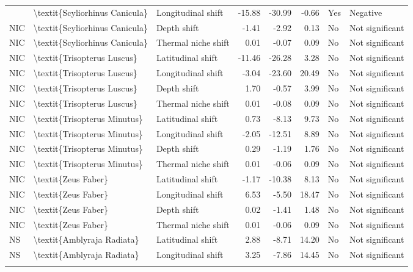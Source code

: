 \begin{longtable}[t]{lllrrrll}
{{NIC & \textbackslash{}textit\{Scyliorhinus Canicula\} & Longitudinal shift & -15.88 & -30.99 & -0.66 & Yes & Negative\\
NIC & \textbackslash{}textit\{Scyliorhinus Canicula\} & Depth shift & -1.41 & -2.92 & 0.13 & No & Not significant\\
\addlinespace
NIC & \textbackslash{}textit\{Scyliorhinus Canicula\} & Thermal niche shift & 0.01 & -0.07 & 0.09 & No & Not significant\\
NIC & \textbackslash{}textit\{Trisopterus Luscus\} & Latitudinal shift & -11.46 & -26.28 & 3.28 & No & Not significant\\
NIC & \textbackslash{}textit\{Trisopterus Luscus\} & Longitudinal shift & -3.04 & -23.60 & 20.49 & No & Not significant\\
NIC & \textbackslash{}textit\{Trisopterus Luscus\} & Depth shift & 1.70 & -0.57 & 3.99 & No & Not significant\\
NIC & \textbackslash{}textit\{Trisopterus Luscus\} & Thermal niche shift & 0.01 & -0.08 & 0.09 & No & Not significant\\
\addlinespace
NIC & \textbackslash{}textit\{Trisopterus Minutus\} & Latitudinal shift & 0.73 & -8.13 & 9.73 & No & Not significant\\
NIC & \textbackslash{}textit\{Trisopterus Minutus\} & Longitudinal shift & -2.05 & -12.51 & 8.89 & No & Not significant\\
NIC & \textbackslash{}textit\{Trisopterus Minutus\} & Depth shift & 0.29 & -1.19 & 1.76 & No & Not significant\\
NIC & \textbackslash{}textit\{Trisopterus Minutus\} & Thermal niche shift & 0.01 & -0.06 & 0.09 & No & Not significant\\
NIC & \textbackslash{}textit\{Zeus Faber\} & Latitudinal shift & -1.17 & -10.38 & 8.13 & No & Not significant\\
\addlinespace
NIC & \textbackslash{}textit\{Zeus Faber\} & Longitudinal shift & 6.53 & -5.50 & 18.47 & No & Not significant\\
NIC & \textbackslash{}textit\{Zeus Faber\} & Depth shift & 0.02 & -1.41 & 1.48 & No & Not significant\\
NIC & \textbackslash{}textit\{Zeus Faber\} & Thermal niche shift & 0.01 & -0.06 & 0.09 & No & Not significant\\
NS & \textbackslash{}textit\{Amblyraja Radiata\} & Latitudinal shift & 2.88 & -8.71 & 14.20 & No & Not significant\\
NS & \textbackslash{}textit\{Amblyraja Radiata\} & Longitudinal shift & 3.25 & -7.86 & 14.45 & No & Not significant\\
}}
\end{longtable}
